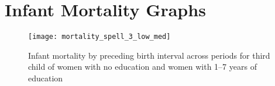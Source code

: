 \documentclass[12pt,letterpaper]{article}
\begin{document}
% 
% 
% 

\section{Infant Mortality Graphs}

\setcounter{figure}{0}
\setcounter{table}{0}



\begin{figure}
\centering
\texttt{[image: mortality\_spell\_3\_low\_med]}
\caption{Infant mortality by preceding birth interval across periods for third child of women with 
no education and women with 1--7 years of education}
\label{fig:mortality_low_med_spell_3}
\end{figure}
\end{document}
